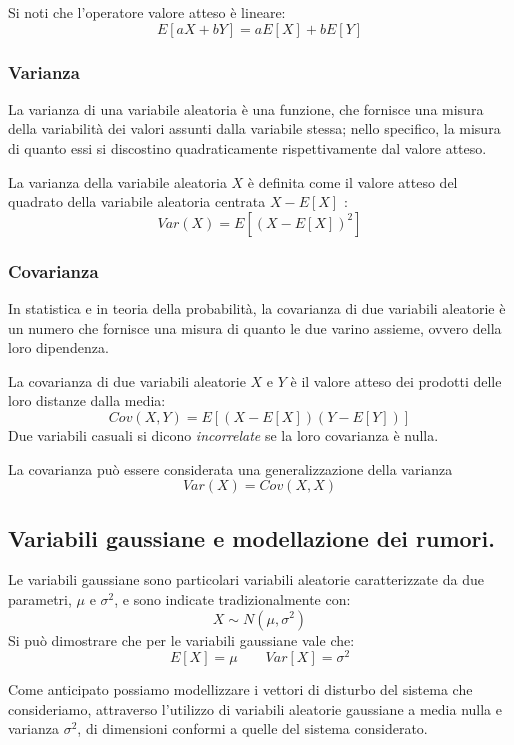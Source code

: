\noindent  Si noti che l'operatore valore atteso è lineare: \[E[aX + bY] = aE[X] + bE[Y]\]




\subsubsection{Varianza}

La varianza di una variabile aleatoria è una funzione, che fornisce una misura della variabilità dei valori assunti dalla variabile stessa; nello specifico, la misura di quanto essi si discostino quadraticamente rispettivamente dal valore atteso.

La varianza della variabile aleatoria $X$ è definita come il valore atteso del quadrato della variabile aleatoria centrata $X - E[X]$ :\[Var(X) = E[(X - E[X])^2]\]

\subsubsection{Covarianza}

In statistica e in teoria della probabilità, la covarianza di due variabili aleatorie è un numero che fornisce una misura di quanto le due varino assieme, ovvero della loro dipendenza.

La covarianza di due variabili aleatorie $X$ e $Y$ è il valore atteso dei prodotti delle loro distanze dalla media: \[Cov(X,Y)= E [(X-E[X])(Y-E[Y])]\]
Due variabili casuali si dicono \textit{incorrelate} se la loro covarianza è nulla.

La covarianza può essere considerata una generalizzazione della varianza \[Var(X) = Cov(X,X)\]

\subsection{Variabili gaussiane e modellazione dei rumori.}

Le variabili gaussiane sono particolari variabili aleatorie caratterizzate da due parametri, $\mu$ e $\sigma^2$, e sono indicate tradizionalmente con: \[X \sim N(\mu ,\sigma^2)\]
Si può dimostrare che per le variabili gaussiane vale che: \[E[X]= \mu \qquad Var[X]= \sigma^2\]

Come anticipato possiamo modellizzare i vettori di disturbo del sistema che consideriamo, attraverso l'utilizzo di variabili aleatorie gaussiane a media nulla e varianza $\sigma^2$, di dimensioni conformi a quelle del sistema considerato.

